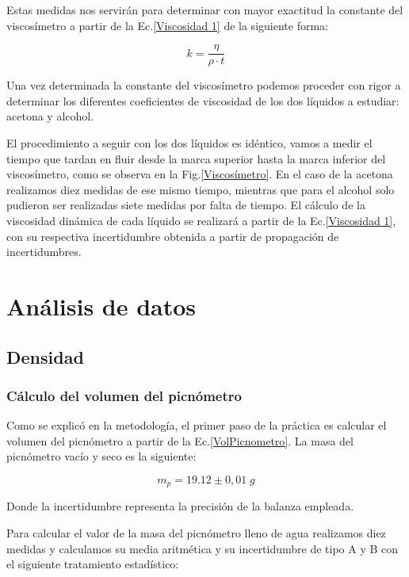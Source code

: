 \documentclass[a4paper,12pt,titlepage]{article}
\begin{document}
\par Estas medidas nos servirán para determinar con mayor exactitud la constante del viscosímetro a partir de la Ec.\ref{Viscosidad 1} de la siguiente forma:

\begin{equation}
    k = \frac{\eta}{\rho \cdot t}
\end{equation}

Una vez determinada la constante del viscosímetro podemos proceder con rigor a determinar los diferentes coeficientes de viscosidad de los dos líquidos a estudiar: acetona y alcohol.

\par El procedimiento a seguir con los dos líquidos es idéntico, vamos a medir el tiempo que tardan en fluir desde la marca superior hasta la marca inferior del viscosímetro, como se observa en la Fig.\ref{Viscosímetro}. En el caso de la acetona realizamos diez medidas de ese mismo tiempo, mientras que para el alcohol solo pudieron ser realizadas siete medidas por falta de tiempo. El cálculo de la viscosidad dinámica de cada líquido se realizará a partir de la Ec.\ref{Viscosidad 1}, con su respectiva incertidumbre obtenida a partir de propagación de incertidumbres.


\newpage

\section{Análisis de datos}

\subsection{Densidad}

\subsubsection{Cálculo del volumen del picnómetro}

Como se explicó en la metodología, el primer paso de la práctica es calcular el volumen del picnómetro a partir de la Ec.\ref{VolPicnometro}. La masa del picnómetro vacío y seco es la siguiente:

\begin{equation}
    m_{p} = 19.12 \pm 0,01 \; g
\end{equation}

Donde la incertidumbre representa la precisión de la balanza empleada.

\par Para calcular el valor de la masa del picnómetro lleno de agua realizamos diez medidas y calculamos su media aritmética y su incertidumbre de tipo A y B con el siguiente tratamiento estadístico:
\end{document}
